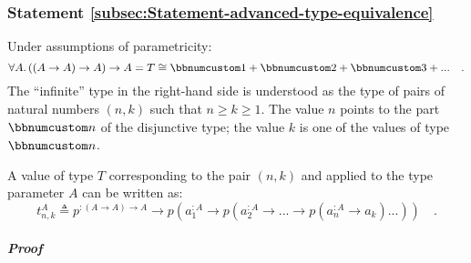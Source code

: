 \subsubsection{Statement \label{subsec:Statement-advanced-type-equivalence}\ref{subsec:Statement-advanced-type-equivalence}}

Under assumptions of parametricity:
\[
\forall A.\,((A\rightarrow A)\rightarrow A)\rightarrow A=T\cong\bbnum 1+\bbnum 2+\bbnum 3+...\quad.
\]
 The \textsf{``}infinite\textsf{''} type in the right-hand side is understood as the
type of pairs of natural numbers $\left(n,k\right)$ such that $n\ge k\ge1$.
The value $n$ points to the part $\bbnum n$ of the disjunctive type;
the value $k$ is one of the values of type $\bbnum n$.

A value of type $T$ corresponding to the pair $\left(n,k\right)$
and applied to the type parameter $A$ can be written as:
\[
t_{n,k}^{A}\triangleq p^{:(A\rightarrow A)\rightarrow A}\rightarrow p(a_{1}^{:A}\rightarrow p(a_{2}^{:A}\rightarrow...\rightarrow p(a_{n}^{:A}\rightarrow a_{k})...))\quad.
\]


\subparagraph{Proof}

